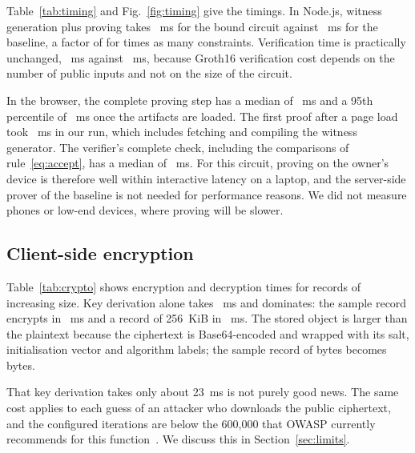 Table~\ref{tab:timing} and Fig.~\ref{fig:timing} give the timings. In
Node.js, witness generation plus proving takes \NewFullProveMs~ms for the
bound circuit against \OldFullProveMs~ms for the baseline, a factor of
\ProveSlowdown{} for \ConstraintGrowth{} times as many constraints.
Verification time is practically unchanged, \NewVerifyMs~ms against
\OldVerifyMs~ms, because Groth16 verification cost depends on the number of
public inputs and not on the size of the circuit.

In the browser, the complete proving step has a median of
\BrowserProveMs~ms and a 95th percentile of \BrowserProvePninetyfive~ms once
the artifacts are loaded. The first proof after a page load took
\BrowserFirstProveMs~ms in our run, which includes fetching and compiling the
witness generator. The verifier's complete check, including the comparisons
of rule~\eqref{eq:accept}, has a median of \BrowserVerifyMs~ms. For this
circuit, proving on the owner's device is therefore well within interactive
latency on a laptop, and the server-side prover of the baseline is not
needed for performance reasons. We did not measure phones or low-end
devices, where proving will be slower.

\subsection{Client-side encryption}

\begin{table}[t]
\centering
\caption{Client-side encryption and decryption (median, ms). ``Stored'' is
the size of the JSON object pinned to IPFS.}
\label{tab:crypto}
\tablefont

\end{table}

Table~\ref{tab:crypto} shows encryption and decryption times for records of
increasing size. Key derivation alone takes \KdfMs~ms and dominates: the
sample record encrypts in \EncSampleMs~ms and a record of 256~KiB in
\EncLargestMs~ms. The stored object is larger than the plaintext because the
ciphertext is Base64-encoded and wrapped with its salt, initialisation vector
and algorithm labels; the sample record of \SamplePlainBytes{} bytes becomes
\SampleStoredBytes{} bytes.

That key derivation takes only about 23~ms is not purely good news. The same
cost applies to each guess of an attacker who downloads the public
ciphertext, and the configured \KdfIterations{} iterations are below the
600{,}000 that OWASP currently recommends for this
function~\cite{owasp-password}. We discuss this in
Section~\ref{sec:limits}.

